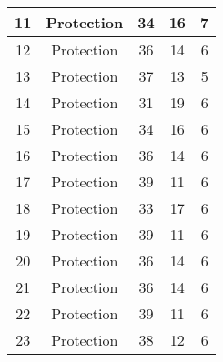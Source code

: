 \documentclass[results.tex]{subfiles}
\begin{document}
\begin{center}
\begin{tabular}{| c || c | c | c | c |}
            \hline
            11                      & Protection                   & 34                     & 16                      & 7                    \\
            \hline
            12                      & Protection                   & 36                     & 14                      & 6                    \\
            \hline
            13                      & Protection                   & 37                     & 13                      & 5                    \\
            \hline
            14                      & Protection                   & 31                     & 19                      & 6                    \\
            \hline
            15                      & Protection                   & 34                     & 16                      & 6                    \\
            \hline
            16                      & Protection                   & 36                     & 14                      & 6                    \\
            \hline
            17                      & Protection                   & 39                     & 11                      & 6                    \\
            \hline
            18                      & Protection                   & 33                     & 17                      & 6                    \\
            \hline
            19                      & Protection                   & 39                     & 11                      & 6                    \\
            \hline
            20                      & Protection                   & 36                     & 14                      & 6                    \\
            \hline
            21                      & Protection                   & 36                     & 14                      & 6                    \\
            \hline
            22                      & Protection                   & 39                     & 11                      & 6                    \\
            \hline
            23                      & Protection                   & 38                     & 12                      & 6                    \\

\end{tabular}
\end{center}
\end{document}
